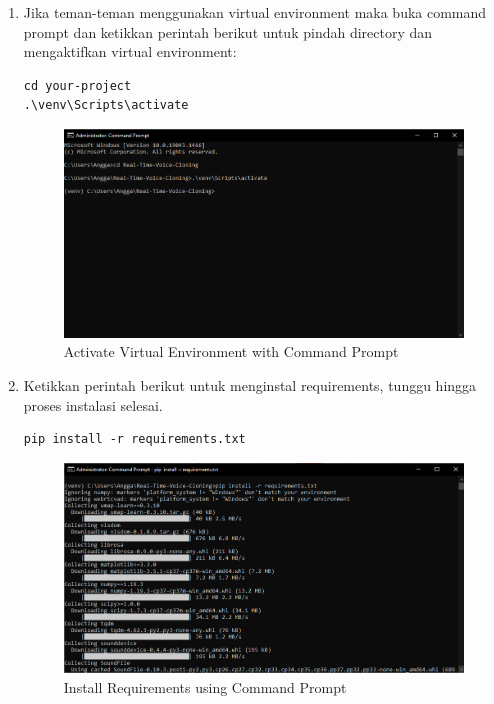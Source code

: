 \begin{enumerate}
\item Jika teman-teman menggunakan virtual environment maka buka command prompt dan ketikkan perintah berikut untuk pindah directory dan mengaktifkan virtual environment:
\begin{lstlisting}
cd your-project
.\venv\Scripts\activate
\end{lstlisting}

\begin{figure}[H]
\centering
\includegraphics[scale=.4]{figures/req1}
\caption{Activate Virtual Environment with Command Prompt}
\label{req1}
\end{figure}

\item Ketikkan perintah berikut untuk menginstal requirements, tunggu hingga proses instalasi selesai.
\begin{lstlisting}
pip install -r requirements.txt
\end{lstlisting}

\begin{figure}[H]
\centering
\includegraphics[scale=.4]{figures/req2}
\caption{Install Requirements using Command Prompt}
\label{req2}
\end{figure}


\end{enumerate}
